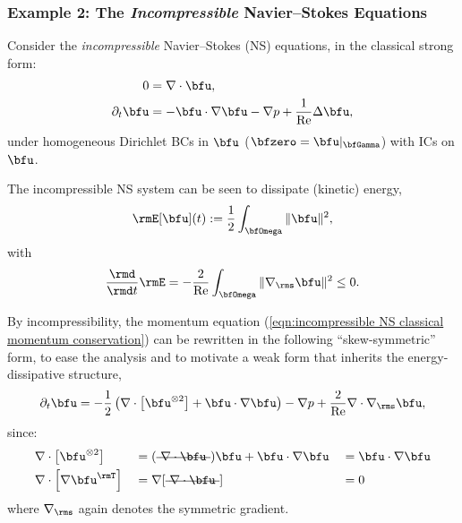 \subsubsection*{Example 2: The \emph{Incompressible} Navier--Stokes Equations}
    Consider the \emph{incompressible} Navier--Stokes (NS) equations, in the classical strong form:
    \begin{align}
                       0  &=  \nabla\cdot\bfu,  \label{eqn:incompressible NS mass conservation}  \\
        \partial_{t}\bfu  &=  - \bfu\cdot\nabla\bfu - \nabla p + \frac{1}{\rmRe}\Delta\bfu,  \label{eqn:incompressible NS classical momentum conservation}
    \end{align}
    under homogeneous Dirichlet BCs in $\bfu$ ($\bfzero  =  \bfu|_{\bfGamma}$) with ICs on $\bfu$.
    
    The incompressible NS system can be seen to dissipate (kinetic) energy,
    \begin{equation}\label{eqn:incompressible NS energy definition}
        \rmE[\bfu](t)  :=  \frac{1}{2}\int_{\bfOmega}\|\bfu\|^{2},
    \end{equation}
    with
    \begin{equation}
        \frac{\rmd}{\rmd t}\rmE  =  - \frac{2}{\rmRe}\int_{\bfOmega}\|\nabla_{\rms}\bfu\|^{2}  \leq  0.
    \end{equation}

    By incompressibility, the momentum equation (\ref{eqn:incompressible NS classical momentum conservation}) can be rewritten in the following ``skew-symmetric'' form, to ease the analysis and to motivate a weak form that inherits the energy-dissipative structure,
    \begin{equation}\label{eqn:incompressible NS skew-symmetric momentum equation}
        \partial_{t}\bfu  =  - \frac{1}{2}\left(\nabla\cdot\left[\bfu^{\otimes 2}\right] + \bfu\cdot\nabla\bfu\right) - \nabla p + \frac{2}{\rmRe}\nabla\cdot\nabla_{\rms}\bfu,
    \end{equation}
    since:
    \begin{align}
        &\nabla\cdot\left[\bfu^{\otimes 2}\right]   &&=  (\mst{\nabla\cdot\bfu})\bfu + \bfu\cdot\nabla\bfu  &&=  \bfu\cdot\nabla\bfu  \\
        &\nabla\cdot\left[\nabla\bfu^{\rmT}\right]  &&=  \nabla[\mst{\nabla\cdot\bfu}]                      &&=  0
    \end{align}
    where $\nabla_{\rms}$ again denotes the symmetric gradient.

